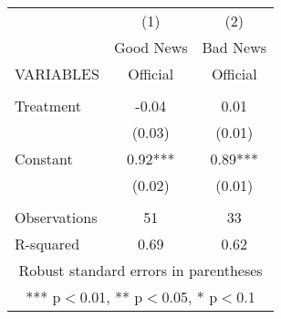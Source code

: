 \begin{tabular}{lcc} \hline
 & (1) & (2) \\
 & Good News & Bad News \\
VARIABLES & Official & Official \\ \hline
 &  &  \\
Treatment & -0.04 & 0.01 \\
 & (0.03) & (0.01) \\
Constant & 0.92*** & 0.89*** \\
 & (0.02) & (0.01) \\
 &  &  \\
Observations & 51 & 33 \\
 R-squared & 0.69 & 0.62 \\ \hline
\multicolumn{3}{c}{ Robust standard errors in parentheses} \\
\multicolumn{3}{c}{ *** p$<$0.01, ** p$<$0.05, * p$<$0.1} \\
\end{tabular}
